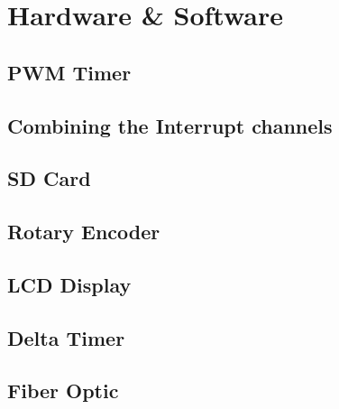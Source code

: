 \chapter{Hardware & Software}


\section{PWM Timer}

\section{Combining the Interrupt channels}


\section{SD Card}


\section{Rotary Encoder}


\section{LCD Display}

\section{Delta Timer}


\section{Fiber Optic}

